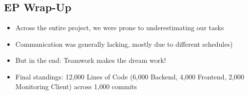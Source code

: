 \documentclass[aspectratio=1610,20pt,utf8]{beamer}
\begin{document}
\subsection{EP Wrap-Up}
\begin{frame}\small
\begin{itemize}
	\frametitle{EP Wrap-Up}
	\item Across the entire project, we were prone to underestimating our tasks
	\item Communication was generally lacking, mostly due to different schedules)
	\item But in the end: Teamwork makes the dream work!
	\item Final standings: 12,000 Lines of Code (6,000 Backend, 4,000 Frontend, 2,000 Monitoring Client) across 1,000 commits
	\end{itemize}
\end{frame}
\end{document}
